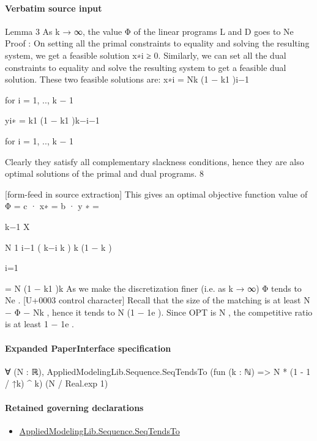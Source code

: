 \documentclass[10pt]{article}
\begin{document}
\paragraph{Verbatim source input}
\begin{ReviewVerbatim}
Lemma 3 As k → ∞, the value Φ of the linear programs L and D goes to Ne
Proof : On setting all the primal constraints to equality and solving the resulting system,
we get a feasible solution x∗i ≥ 0. Similarly, we can set all the dual constraints to equality and
solve the resulting system to get a feasible dual solution.
These two feasible solutions are:
x∗i = Nk (1 − k1 )i−1

for i = 1, .., k − 1

yi∗ = k1 (1 − k1 )k−i−1

for i = 1, .., k − 1

Clearly they satisfy all complementary slackness conditions, hence they are also optimal solutions of the primal and dual programs.
8


[form-feed in source extraction]
This gives an optimal objective function value of
Φ = c · x∗ = b · y ∗
=

k−1
X

N
1 i−1
( k−i
k ) k (1 − k )

i=1

= N (1 − k1 )k
As we make the discretization finer (i.e. as k → ∞) Φ tends to Ne .
[U+0003 control character]
Recall that the size of the matching is at least N − Φ − Nk , hence it tends to N (1 − 1e ). Since
OPT is N , the competitive ratio is at least 1 − 1e .
\end{ReviewVerbatim}



\paragraph{Expanded PaperInterface specification}
\begin{ReviewVerbatim}
∀ (N : ℝ), AppliedModelingLib.Sequence.SeqTendsTo (fun (k : ℕ) => N * (1 - 1 / ↑k) ^ k) (N / Real.exp 1)
\end{ReviewVerbatim}

\paragraph{Retained governing declarations}
\begin{itemize}\raggedright
\item \hyperlink{governing-declaration-ed891837c3cd4610}{Applied\allowbreak{}Modeling\allowbreak{}Lib.\allowbreak{}Sequence.\allowbreak{}Seq\allowbreak{}Tends\allowbreak{}To}
\end{itemize}
\end{document}
